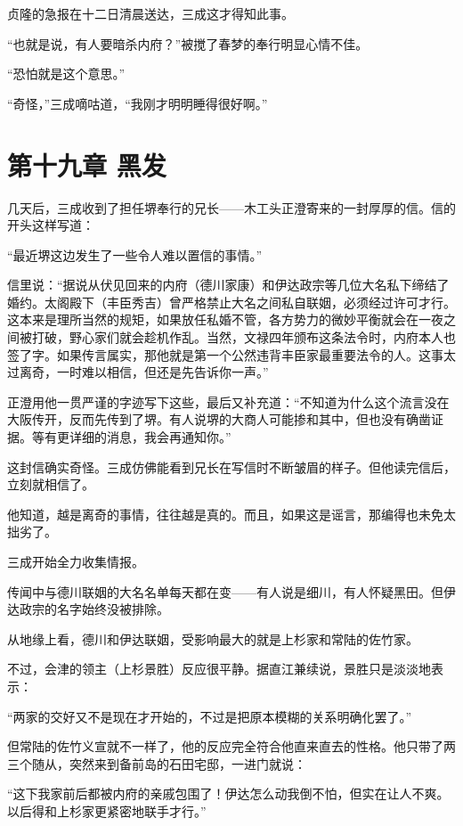 \documentclass[
]{book}
\begin{document}
贞隆的急报在十二日清晨送达，三成这才得知此事。

``也就是说，有人要暗杀内府？''被搅了春梦的奉行明显心情不佳。

``恐怕就是这个意思。''

``奇怪，''三成嘀咕道，``我刚才明明睡得很好啊。''

\chapter*{第十九章 黑发}\label{ux7b2cux5341ux4e5dux7ae0-ux9ed1ux53d1}

几天后，三成收到了担任堺奉行的兄长------木工头正澄寄来的一封厚厚的信。信的开头这样写道：

``最近堺这边发生了一些令人难以置信的事情。''

信里说：``据说从伏见回来的内府（德川家康）和伊达政宗等几位大名私下缔结了婚约。太阁殿下（丰臣秀吉）曾严格禁止大名之间私自联姻，必须经过许可才行。这本来是理所当然的规矩，如果放任私婚不管，各方势力的微妙平衡就会在一夜之间被打破，野心家们就会趁机作乱。当然，文禄四年颁布这条法令时，内府本人也签了字。如果传言属实，那他就是第一个公然违背丰臣家最重要法令的人。这事太过离奇，一时难以相信，但还是先告诉你一声。''

正澄用他一贯严谨的字迹写下这些，最后又补充道：``不知道为什么这个流言没在大阪传开，反而先传到了堺。有人说堺的大商人可能掺和其中，但也没有确凿证据。等有更详细的消息，我会再通知你。''

这封信确实奇怪。三成仿佛能看到兄长在写信时不断皱眉的样子。但他读完信后，立刻就相信了。

他知道，越是离奇的事情，往往越是真的。而且，如果这是谣言，那编得也未免太拙劣了。

三成开始全力收集情报。

传闻中与德川联姻的大名名单每天都在变------有人说是细川，有人怀疑黑田。但伊达政宗的名字始终没被排除。

从地缘上看，德川和伊达联姻，受影响最大的就是上杉家和常陆的佐竹家。

不过，会津的领主（上杉景胜）反应很平静。据直江兼续说，景胜只是淡淡地表示：

``两家的交好又不是现在才开始的，不过是把原本模糊的关系明确化罢了。''

但常陆的佐竹义宣就不一样了，他的反应完全符合他直来直去的性格。他只带了两三个随从，突然来到备前岛的石田宅邸，一进门就说：

``这下我家前后都被内府的亲戚包围了！伊达怎么动我倒不怕，但实在让人不爽。以后得和上杉家更紧密地联手才行。''
\end{document}
